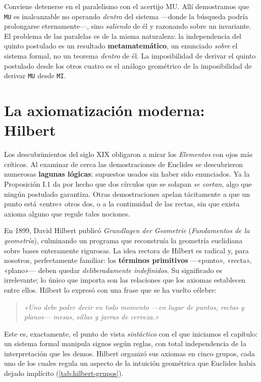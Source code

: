Conviene detenerse en el paralelismo con el acertijo MU. Allí demostramos que \texttt{MU} es inalcanzable no operando
\emph{dentro} del sistema —donde la búsqueda podría prolongarse eternamente—, sino \emph{saliendo} de él y razonando
sobre un invariante. El problema de las paralelas es de la misma naturaleza: la independencia del quinto postulado es
un resultado \textbf{metamatemático}, un enunciado \emph{sobre} el sistema formal, no un teorema \emph{dentro} de él.
La imposibilidad de derivar el quinto postulado desde los otros cuatro es el análogo geométrico de la imposibilidad de
derivar \texttt{MU} desde \texttt{MI}.

\section{La axiomatización moderna: Hilbert}

Los descubrimientos del siglo XIX obligaron a mirar los \emph{Elementos} con ojos más críticos. Al examinar de cerca
las demostraciones de Euclides se descubrieron numerosas \textbf{lagunas lógicas}: supuestos usados sin haber sido
enunciados. Ya la Proposición I.1 da por hecho que dos círculos que se solapan \emph{se cortan}, algo que ningún
postulado garantiza. Otras demostraciones apelan tácitamente a que un punto está «entre» otros dos, o a la continuidad
de las rectas, sin que exista axioma alguno que regule tales nociones.

En 1899, David Hilbert publicó \emph{Grundlagen der Geometrie} (\emph{Fundamentos de la geometría}), culminando un programa que reconstruía la geometría euclidiana sobre bases enteramente rigurosas. La
idea rectora de Hilbert es radical y, para nosotros, perfectamente familiar: los \textbf{términos primitivos} —«punto»,
«recta», «plano»— deben quedar \emph{deliberadamente indefinidos}. Su significado es irrelevante; lo único que importa
son las relaciones que los axiomas establecen entre ellos. Hilbert lo expresó con una frase que se ha vuelto célebre:

\begin{quote}
    \emph{«Uno debe poder decir en todo momento —en lugar de puntos, rectas y planos— mesas, sillas y jarras de
        cerveza.»}
\end{quote}

Este es, exactamente, el punto de vista \emph{sintáctico} con el que iniciamos el capítulo: un sistema formal manipula
signos según reglas, con total independencia de la interpretación que les demos. Hilbert organizó sus axiomas en cinco
grupos, cada uno de los cuales regula un aspecto de la intuición geométrica que Euclides había dejado implícito
(\autoref{tab:hilbert-grupos}).

